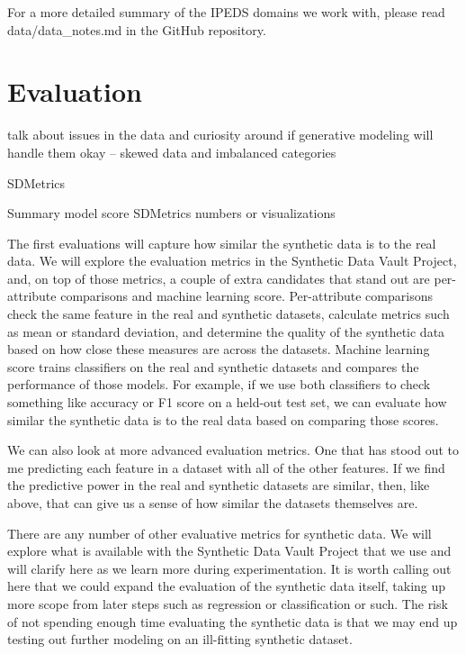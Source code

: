 \documentclass[sigconf, authorversion, nonacm]{acmart}
\begin{document}
            For a more detailed summary of the IPEDS domains we work with, please read data/data\_notes.md in the GitHub repository.

\section{Evaluation}


    talk about issues in the data and curiosity around if generative modeling will handle them okay -- skewed data and imbalanced categories

    SDMetrics

    Summary model score
    SDMetrics numbers or visualizations


    The first evaluations will capture how similar the synthetic data is to the real data. We will explore the evaluation metrics in the Synthetic Data Vault Project, and, on top of those metrics, a couple of extra candidates that stand out are per-attribute comparisons and machine learning score. Per-attribute comparisons check the same feature in the real and synthetic datasets, calculate metrics such as mean or standard deviation, and determine the quality of the synthetic data based on how close these measures are across the datasets. Machine learning score trains classifiers on the real and synthetic datasets and compares the performance of those models. For example, if we use both classifiers to check something like accuracy or F1 score on a held-out test set, we can evaluate how similar the synthetic data is to the real data based on comparing those scores.

    We can also look at more advanced evaluation metrics. One that has stood out to me predicting each feature in a dataset with all of the other features. If we find the predictive power in the real and synthetic datasets are similar, then, like above, that can give us a sense of how similar the datasets themselves are.

    There are any number of other evaluative metrics for synthetic data. We will explore what is available with the Synthetic Data Vault Project that we use and will clarify here as we learn more during experimentation. It is worth calling out here that we could expand the evaluation of the synthetic data itself, taking up more scope from later steps such as regression or classification or such. The risk of not spending enough time evaluating the synthetic data is that we may end up testing out further modeling on an ill-fitting synthetic dataset.
\end{document}
